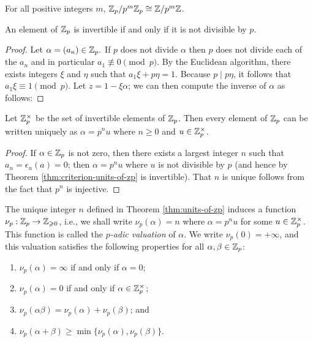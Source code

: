 \begin{corollary}
    For all positive integers \(m\), \(\mathbb{Z}_p / p^m \mathbb{Z}_p \cong \mathbb{Z} / p^m \mathbb{Z}\).
\end{corollary}

\begin{theoremx}\label{thm:criterion-units-of-zp}
    An element of \(\mathbb{Z}_p\) is invertible if and only if it is not divisible by \(p\).
\end{theoremx}

\begin{proof}
    Let \(\alpha = (a_n) \in \mathbb{Z}_p.\) If \(p\) does not divide \(\alpha\) then \(p\) does not divide each of the \(a_n\) and in particular \(a_1 \not\equiv 0 \pmod{p}\). By the Euclidean algorithm, there exists integers \(\xi\) and \(\eta\) such that \(a_1\xi + p\eta = 1\). Because \(p \mid p\eta\), it follows that \(a_1\xi \equiv 1 \pmod{p}\). Let \(z = 1 - \xi\alpha\); we can then compute the inverse of \(\alpha\) as follows:
\end{proof}

\begin{theoremx}\label{thm:units-of-zp}
    Let \(\mathbb{Z}_p^{\times}\) be the set of invertible elements of \(\mathbb{Z}_p\). Then every element of \(\mathbb{Z}_p\) can be written uniquely as \(\alpha = p^nu\) where \(n \geq 0\) and \(u \in \mathbb{Z}_p^{\times}\).
\end{theoremx}

\begin{proof}
    If \(\alpha \in \mathbb{Z}_p\) is not zero, then there exists a largest integer \(n\) such that \(a_n = \epsilon_n(a) = 0\); then \(\alpha = p^nu\) where \(u\) is not divisible by \(p\) (and hence by Theorem \ref{thm:criterion-units-of-zp} is invertible). That \(n\) is unique follows from the fact that \(p^n\) is injective.
\end{proof}

\smallskip

The unique integer \(n\) defined in Theorem \ref{thm:units-of-zp} induces a function \(\nu_p : \mathbb{Z}_p \to \mathbb{Z}_{\geqslant 0}\), i.e., we shall write \(\nu_p(\alpha) = n\) where \(\alpha = p^nu\) for some \(u \in \mathbb{Z}_p^{\times}\). This function is called the \emph{\(p\)-adic valuation} of \(\alpha\). We write \(\nu_p(0) = +\infty\), and this valuation satisfies the following properties for all \(\alpha, \beta \in \mathbb{Z}_p\):

\smallskip

\begin{enumerate}[nosep, label=(\roman*)]
    \item \(\nu_p(\alpha) =\infty\) if and only if \(\alpha = 0\);\label{item:padic-valuation-zero}
    \item \(\nu_p(\alpha) = 0\) if and only if \(\alpha \in \mathbb{Z}_p^{\times}\);\label{item:padic-valuation-units}
    \item \(\nu_p(\alpha\beta) = \nu_p(\alpha) + \nu_p(\beta)\); and\label{item:padic-valuation-product}
    \item \(\nu_p(\alpha + \beta) \geq \min\{\nu_p(\alpha), \nu_p(\beta)\}\).
    \label{item:padic-valuation-sum}
\end{enumerate}

